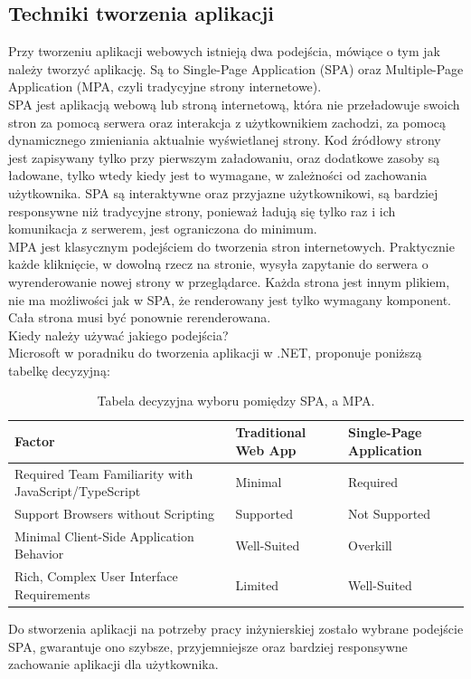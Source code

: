 \documentclass[12pt]{article}
\begin{document}
\begin{sloppypar}
{\subsection{Techniki tworzenia aplikacji}
{
  Przy tworzeniu aplikacji webowych istnieją dwa podejścia, mówiące o tym jak należy tworzyć aplikację. 
  Są to Single-Page Application (SPA) oraz Multiple-Page Application (MPA, czyli tradycyjne strony internetowe). \\
  SPA jest aplikacją webową lub stroną internetową, która nie przeładowuje swoich stron za pomocą serwera oraz interakcja z użytkownikiem zachodzi, 
  za pomocą dynamicznego zmieniania aktualnie wyświetlanej strony. Kod źródłowy strony jest zapisywany tylko przy pierwszym załadowaniu, oraz 
  dodatkowe zasoby są ładowane, tylko wtedy kiedy jest to wymagane, w zależności od zachowania użytkownika. 
  SPA są interaktywne oraz przyjazne użytkownikowi, są bardziej responsywne niż tradycyjne strony, ponieważ ładują się tylko raz i ich komunikacja z serwerem,
  jest ograniczona do minimum. \cite{spa-conference} \\
  MPA jest klasycznym podejściem do tworzenia stron internetowych. 
  Praktycznie każde kliknięcie, w dowolną rzecz na stronie, wysyła zapytanie do serwera o wyrenderowanie nowej strony w przeglądarce.
  Każda strona jest innym plikiem, nie ma możliwości jak w SPA, że renderowany jest tylko wymagany komponent. Cała strona musi być ponownie rerenderowana. \\
  Kiedy należy używać jakiego podejścia? \\
  Microsoft w poradniku do tworzenia aplikacji w .NET, proponuje poniższą tabelkę decyzyjną\cite{mc-spa}:
  \begin{center}
    \begin{table}
      \begin{tabular}{ | m{5cm} | m{5cm}| m{5cm} | } 
        \hline
        Factor & Traditional Web App & Single-Page Application \\
        \hline
        Required Team Familiarity with JavaScript/TypeScript & Minimal & Required \\
        \hline
        Support Browsers without Scripting & Supported & Not Supported \\
        \hline
        Minimal Client-Side Application Behavior & Well-Suited & Overkill \\
        \hline
        Rich, Complex User Interface Requirements & Limited & Well-Suited \\
        \hline
      \end{tabular}
      \caption{\label{tab:decision-table}Tabela decyzyjna wyboru pomiędzy SPA, a MPA.}
    \end{table}
  \end{center}
  Do stworzenia aplikacji na potrzeby pracy inżynierskiej zostało wybrane podejście SPA, gwarantuje ono szybsze, przyjemniejsze oraz bardziej responsywne 
  zachowanie aplikacji dla użytkownika.
}
}
\end{sloppypar}
\end{document}
